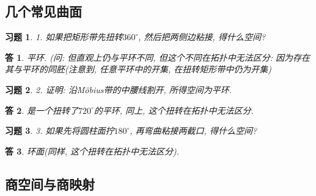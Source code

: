 \documentclass{ctexart}%
\newtheorem*{exercise}{习题}
\newtheorem*{solution}{答}
\theoremstyle{definition}
\theoremstyle{remark}
\begin{document}
\subsection{几个常见曲面}

\begin{exercise}1. 如果把矩形带先扭转$360^\circ$, 然后把两侧边粘接, 得什么空间?
\end{exercise}
\begin{solution}平环. (问: 但直观上仍与平环不同, 但这个不同在拓扑中无法区分: 因为存在其与平环的同胚(注意到, 任意平环中的开集, 在扭转矩形带中仍为开集)
\end{solution}

\begin{exercise}2. 证明: 沿M\"{o}bius带的中腰线割开, 所得空间为平环.
\end{exercise}
\begin{solution}是一个扭转了$720^\circ$的平环, 同上, 这个扭转在拓扑中无法区分.  
\end{solution}

\begin{exercise}3. 如果先将圆柱面拧$180^\circ$, 再弯曲粘接两截口, 得什么空间?
\end{exercise}
\begin{solution}环面(同样, 这个扭转在拓扑中无法区分). 
\end{solution}

\subsection{商空间与商映射}
\end{document}
